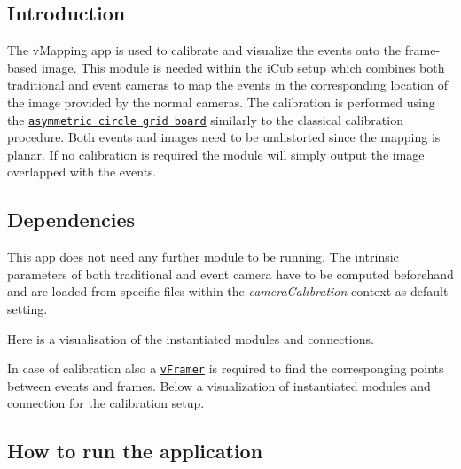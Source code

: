 \subsection*{Introduction}

The v\+Mapping app is used to calibrate and visualize the events onto the frame-\/based image. This module is needed within the i\+Cub setup which combines both traditional and event cameras to map the events in the corresponding location of the image provided by the normal cameras. The calibration is performed using the \href{https://nerian.com/support/resources/patterns/}{\tt asymmetric circle grid board} similarly to the classical calibration procedure. Both events and images need to be undistorted since the mapping is planar. If no calibration is required the module will simply output the image overlapped with the events.

\subsection*{Dependencies}

This app does not need any further module to be running. The intrinsic parameters of both traditional and event camera have to be computed beforehand and are loaded from specific files within the {\itshape camera\+Calibration} context as default setting.

Here is a visualisation of the instantiated modules and connections.



In case of calibration also a \href{http://robotology.github.io/event-driven/doxygen/doc/html/group__vFramer.html}{\tt v\+Framer} is required to find the corresponging points between events and frames. Below a visualization of instantiated modules and connection for the calibration setup.



\subsection*{How to run the application}


